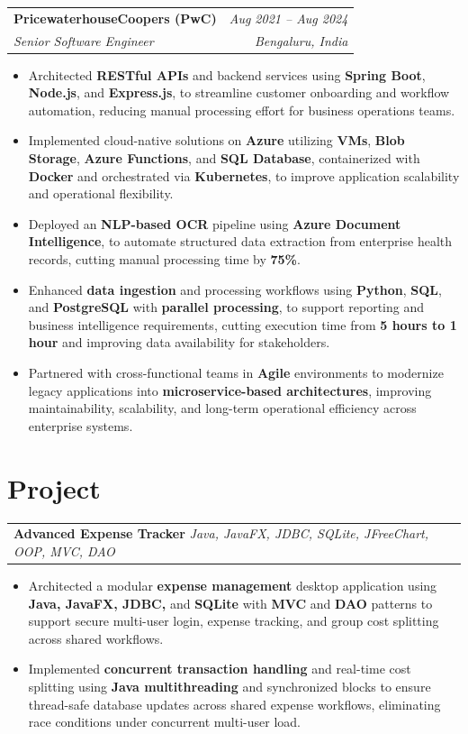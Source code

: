\documentclass[10pt]{article}
\makeatletter
\newcommand{\resumeSubheading}[4]{
  \vspace{3pt}
  \begin{tabular*}{\textwidth}{@{}l@{\extracolsep{\fill}}r@{}}
    \textbf{#1} & \textit{#4} \\
    \textit{#3} & \textit{#2} \\
  \end{tabular*}\vspace{0pt}
}
\newcommand{\resumeProject}[3]{
  \vspace{2pt}
  \begin{tabular*}{\textwidth}{@{}l@{\extracolsep{\fill}}r@{}}
    \textbf{#1} \textbar{} \textit{#2} & #3 \\
  \end{tabular*}\vspace{-2pt}
}
\newcommand{\resumeItemListStart}{\begin{itemize}[leftmargin=12pt, itemsep=0.4pt, topsep=0.6pt, parsep=0pt]}
\newcommand{\resumeItemListEnd}{\end{itemize}\vspace{-1pt}}
\makeatother
\begin{document}
\resumeSubheading
{PricewaterhouseCoopers (PwC)}{Bengaluru, India}
{Senior Software Engineer}{Aug 2021 -- Aug 2024}
\resumeItemListStart
  \item \footnotesize{Architected \textbf{RESTful APIs} and backend services using \textbf{Spring Boot}, \textbf{Node.js}, and \textbf{Express.js}, to streamline customer onboarding and workflow automation, reducing manual processing effort for business operations teams.}
  \item \footnotesize{Implemented cloud-native solutions on \textbf{Azure} utilizing \textbf{VMs}, \textbf{Blob Storage}, \textbf{Azure Functions}, and \textbf{SQL Database}, containerized with \textbf{Docker} and orchestrated via \textbf{Kubernetes}, to improve application scalability and operational flexibility.}
  \item \footnotesize{Deployed an \textbf{NLP-based OCR} pipeline using \textbf{Azure Document Intelligence}, to automate structured data extraction from enterprise health records, cutting manual processing time by \textbf{75\%}.}
  \item \footnotesize{Enhanced \textbf{data ingestion} and processing workflows using \textbf{Python}, \textbf{SQL}, and \textbf{PostgreSQL} with \textbf{parallel processing}, to support reporting and business intelligence requirements, cutting execution time from \textbf{5 hours to 1 hour} and improving data availability for stakeholders.}
  \item \footnotesize{Partnered with cross-functional teams in \textbf{Agile} environments to modernize legacy applications into \textbf{microservice-based architectures}, improving maintainability, scalability, and long-term operational efficiency across enterprise systems.}
\resumeItemListEnd

\section{Project}
\resumeProject
{Advanced Expense Tracker}{Java, JavaFX, JDBC, SQLite, JFreeChart, OOP, MVC, DAO}{}
\resumeItemListStart
  \item \footnotesize{Architected a modular \textbf{expense management} desktop application using \textbf{Java, JavaFX, JDBC,} and \textbf{SQLite} with \textbf{MVC} and \textbf{DAO} patterns to support secure multi-user login, expense tracking, and group cost splitting across shared workflows.}
  \item \footnotesize{Implemented \textbf{concurrent transaction handling} and real-time cost splitting using \textbf{Java multithreading} and synchronized blocks to ensure thread-safe database updates across shared expense workflows, eliminating race conditions under concurrent multi-user load.}
\resumeItemListEnd
\vspace{2pt}
\end{document}
